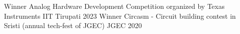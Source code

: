 
\begin{cvhonors}

  \cvhonor
    {Winner} %
    {Analog Hardware Development Competition organized by Texas Instruments} %
    {IIT Tirupati} %
    {2023} %
  \cvhonor
    {Winner} %
    {Circasm - Circuit building contest in Sristi (annual tech-fest of JGEC)} %
    {JGEC} %
    {2020} %
\end{cvhonors}